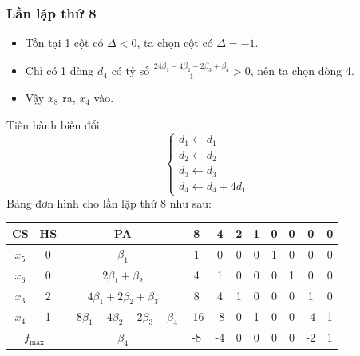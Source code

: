 \documentclass[12pt]{article}
\begin{document}
\subsubsection{Lần lặp thứ 8}
\begin{itemize}
\item Tồn tại 1 cột có $\Delta < 0$, ta chọn cột có $\Delta = -1$.
\item Chỉ có 1 dòng $d_4$ có tỷ số $\displaystyle \frac{24\beta_1 - 4\beta_2 - 2\beta_3 + \beta_4}{1} > 0$, nên ta chọn dòng 4.
\item Vậy $x_8$ ra, $x_4$ vào.
\end{itemize}
Tiến hành biến đổi:
$$
\left\{
\begin{array}{lll}
d_1 \leftarrow d_1 \\
d_2 \leftarrow d_2\\
d_3 \leftarrow d_3\\
d_4 \leftarrow d_4 + 4d_1
\end{array}
\right.
$$
Bảng đơn hình cho lần lặp thứ 8 như sau:
\begin{table}[H]
\centering
\begin{tabular}{|c|c|c|c|c|c|c|c|c|c|c|}
\hline
CS & HS & PA & 8 & 4 & 2 & 1 & 0 & 0 & 0 & 0 \\
\hline
$x_5$ & 0 & $\beta_1$ & 1 & 0 & 0 & 0 & 1 & 0 & 0 & 0 \\
$x_6$ & 0 & $2\beta_1 + \beta_2$ & 4 & 1 & 0 & 0 & 0 & 1 & 0 & 0 \\
$x_3$ & 2 & $4\beta_1 + 2\beta_2 + \beta_3$ & 8 & 4 & 1 & 0 & 0 & 0 & 1 & 0 \\
$x_4$ & 1 & $-8\beta_1 - 4\beta_2 - 2\beta_3 + \beta_4$ & -16 & -8 & 0 & 1 & 0 & 0 & -4 & 1 \\
\hline
\multicolumn{2}{|c|}{$f_{\max}$}
& $\beta_4$ & -8 & -4 & 0 & 0 & 0 & 0 & -2 & 1 \\
\hline
\end{tabular}
\end{table}
\end{document}
